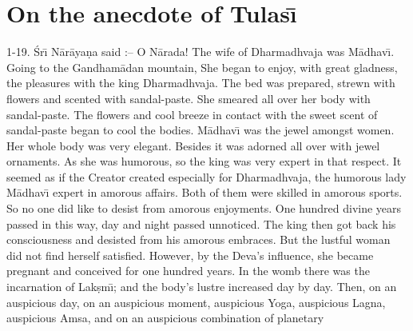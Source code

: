 \chapter{On the anecdote of Tulas\={\i}}

1-19. \'Sr\={\i} N\=ar\=aya\d{n}a said :-- O N\=arada! The wife of Dharmadhvaja was M\=adhav\={\i}. Going to the Gandham\=adan mountain, She began to enjoy, with great gladness, the pleasures with the king Dharmadhvaja. The bed was prepared, strewn with flowers and scented with sandal-paste. She smeared all over her body with sandal-paste. The flowers and cool breeze in contact with the sweet scent of sandal-paste began to cool the bodies. M\=adhav\={\i} was the jewel amongst women. Her whole body was very elegant. Besides it was adorned all over with jewel ornaments. As she was humorous, so the king was very expert in that respect. It seemed as if the Creator created especially for Dharmadhvaja, the humorous lady M\=adhav\={\i} expert in amorous affairs. Both of them were skilled in amorous sports. So no one did like to desist from amorous enjoyments. One hundred divine years passed in this way, day and night passed unnoticed. The king then got back his consciousness and desisted from his amorous embraces. But the lustful woman did not find herself satisfied. However, by the Deva's influence, she became pregnant and conceived for one hundred years. In the womb there was the incarnation of Lak\d{s}m\={\i}; and the body's lustre increased day by day. Then, on an auspicious day, on an auspicious moment, auspicious Yoga, auspicious Lagna, auspicious Amsa, and on an auspicious combination of planetary

